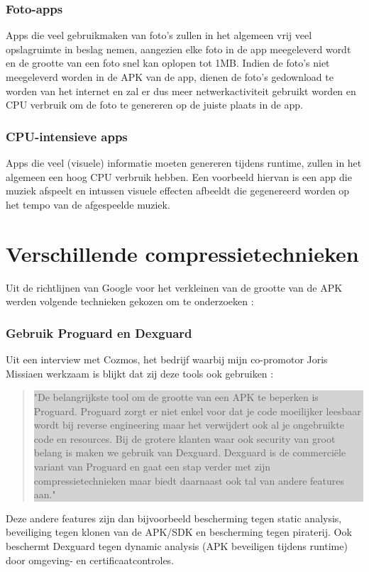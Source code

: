 \subsubsection{Foto-apps}
Apps die veel gebruikmaken van foto's zullen in het algemeen vrij veel opslagruimte in beslag nemen, aangezien elke foto in de app meegeleverd wordt en de grootte van een foto snel kan oplopen tot 1MB. Indien de foto's niet meegeleverd worden in de APK van de app, dienen de foto's gedownload te worden van het internet en zal er dus meer netwerkactiviteit gebruikt worden en CPU verbruik om de foto te genereren op de juiste plaats in de app.
\subsubsection{CPU-intensieve apps}
Apps die veel (visuele) informatie moeten genereren tijdens runtime, zullen in het algemeen een hoog CPU verbruik hebben. Een voorbeeld hiervan is een app die muziek afspeelt en intussen visuele effecten afbeeldt die gegenereerd worden op het tempo van de afgespeelde muziek.  

\section{Verschillende compressietechnieken}
\label{sec:compressietechnieken}

Uit de richtlijnen van Google voor het verkleinen van de grootte van de APK werden volgende technieken gekozen om te onderzoeken \autocite{googlereduceapksize}: 

\subsubsection{Gebruik Proguard en Dexguard}
Uit een interview met Cozmos, het bedrijf waarbij mijn co-promotor Joris Missiaen werkzaam is blijkt dat zij deze tools ook gebruiken : 
\begin{quote}
	\colorbox{lightgray}{\parbox{350px}{"De belangrijkste tool om de grootte van een APK te beperken is Proguard. Proguard zorgt er niet enkel voor dat je code moeilijker leesbaar wordt bij reverse engineering maar het verwijdert ook al je ongebruikte code en resources.
			Bij de grotere klanten waar ook security van groot belang is maken we gebruik van Dexguard. Dexguard is de commerciële variant van Proguard en gaat een stap verder met zijn compressietechnieken maar biedt daarnaast ook tal van andere features aan."
	}}
\end{quote}
Deze andere features zijn dan bijvoorbeeld bescherming tegen static analysis, beveiliging tegen klonen van de APK/SDK en bescherming tegen piraterij. Ook beschermt Dexguard tegen dynamic analysis (APK beveiligen tijdens runtime) door omgeving- en certificaatcontroles. 

